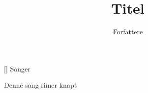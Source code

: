 \documentclass[a4paper,11pt]{article}
\title{Titel}
\author{Forfattere}
\begin{document}
\maketitle

\begin{roles}
[] Sanger
\end{roles}


\begin{song}
 Denne sang rimer knapt
\end{song}
\end{document}
